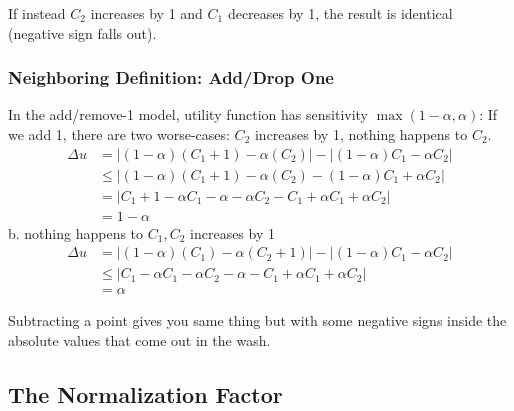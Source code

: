 \documentclass[11pt]{scrartcl} %
\begin{document}
If instead $C_2$ increases by 1 and $C_1$ decreases by 1, the result is identical (negative sign falls out).


\subsubsection{Neighboring Definition: Add/Drop One}

In the add/remove-1 model, utility function has sensitivity $\max(1-\alpha, \alpha)$:
If we add 1, there are two worse-cases: $C_2$ increases by 1, nothing happens to $C_2$.
\begin{align*}
\Delta u &= \left\vert (1-\alpha) (C_1 + 1) - \alpha (C_2) \right\vert - \left\vert (1-\alpha) C_1 - \alpha C_2 \right\vert \\
 &\le \left\vert (1-\alpha) (C_1 + 1) - \alpha (C_2) - (1-\alpha) C_1 + \alpha C_2 \right\vert \\
&= \left\vert C_1 + 1 - \alpha C_1 - \alpha - \alpha C_2 - C_1 + \alpha C_1 + \alpha C_2 \right\vert \\
&= 1 - \alpha
\end{align*}
b. nothing happens to $C_1, C_2$ increases by 1
\begin{align*}
\Delta u &= \left\vert (1-\alpha) (C_1) - \alpha (C_2 + 1) \right\vert - \left\vert (1-\alpha) C_1 - \alpha C_2 \right\vert \\
&\le \left\vert C_1 -\alpha C_1 - \alpha C_2 - \alpha - C_1 + \alpha C_1 + \alpha C_2 \right\vert \\
&= \alpha 
\end{align*}

Subtracting a point gives you same thing but with some negative signs inside the absolute values that come out in the wash.

\subsection{The Normalization Factor}


\nocite{*}

\end{document}
